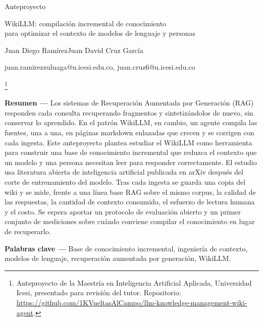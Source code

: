 \documentclass[11pt,letterpaper]{article}
\newcommand{\notasinmarca}[1]{%
  \begingroup\renewcommand{\thefootnote}{}\footnote{#1}\addtocounter{footnote}{-1}\endgroup}
\begin{document}
\thispagestyle{fancy}

\begin{center}
{\Large Anteproyecto\par}
\vspace{4pt}
{\LARGE WikiLLM: compilación incremental de conocimiento\\[2pt]
para optimizar el contexto de modelos de lenguaje y personas\par}
\vspace{8pt}
{\ttfamily\small Juan Diego Ramírez\quad Juan David Cruz García\par}
{\ttfamily\small juan.ramirezzuluaga@u.icesi.edu.co, juan.cruz6@u.icesi.edu.co\par}
\end{center}

\vspace{4pt}

\notasinmarca{Anteproyecto de la Maestría en Inteligencia Artificial Aplicada, Universidad Icesi,
presentado para revisión del tutor. Repositorio:
\url{https://github.com/1KVueltasAlCampo/llm-knowledge-management-wiki-agent}.}

\noindent\textbf{Resumen —} Los sistemas de Recuperación Aumentada por Generación (RAG) responden
cada consulta recuperando fragmentos y sintetizándolos de nuevo, sin conservar lo aprendido. En
el patrón WikiLLM, en cambio, un agente compila las fuentes, una a una, en páginas markdown
enlazadas que crecen y se corrigen con cada ingesta. Este anteproyecto plantea estudiar el WikiLLM como
herramienta para construir una base de conocimiento incremental que reduzca el contexto que un
modelo y una persona necesitan leer para responder correctamente. El estudio usa literatura abierta
de inteligencia artificial publicada en arXiv después del corte de entrenamiento del modelo. Tras cada ingesta se guarda una copia del wiki y
se mide, frente a una línea base RAG sobre el mismo corpus, la calidad de las respuestas, la
cantidad de contexto consumido, el esfuerzo de lectura humana y el costo. Se espera aportar
un protocolo de evaluación abierto y un primer conjunto de mediciones sobre cuándo conviene
compilar el conocimiento en lugar de recuperarlo.

\vspace{4pt}
\noindent\textbf{Palabras clave —} Base de conocimiento incremental, ingeniería de contexto,
modelos de lenguaje, recuperación aumentada por generación, WikiLLM.

\end{document}
